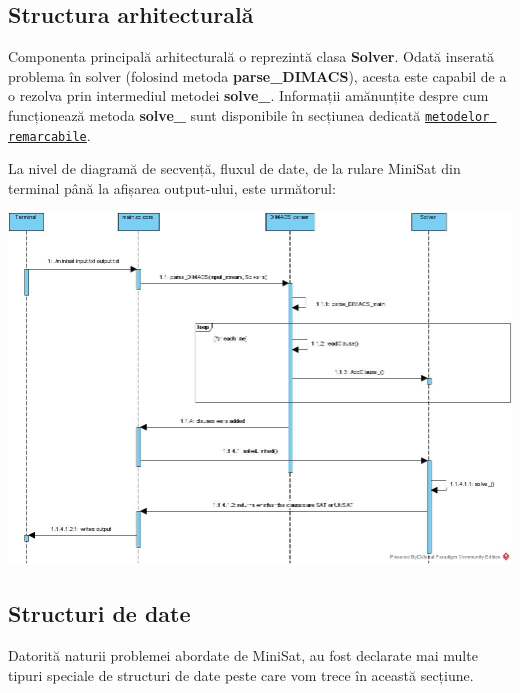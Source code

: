 \documentclass{llncs}
\begin{document}
\subsection{Structura arhitecturală}
Componenta principală arhitecturală o reprezintă clasa \textbf{Solver}. Odată inserată problema în solver (folosind metoda \textbf{parse\_DIMACS}), acesta este capabil de a o rezolva prin intermediul metodei \textbf{solve\_}. Informații amănunțite despre cum funcționează metoda \textbf{solve\_} sunt disponibile în secțiunea dedicată \hyperref[sec:metode_remarcabile]{\texttt{metodelor remarcabile}}.

La nivel de diagramă de secvență, fluxul de date, de la rulare MiniSat din terminal până la afișarea output-ului, este următorul:

\includegraphics[width=1\textwidth]{resources/Minisat_main_sequence_diagram.jpg}

\subsection{Structuri de date}
\label{sec:data_structures}
Datorită naturii problemei abordate de MiniSat, au fost declarate mai multe tipuri speciale de structuri de date peste care vom trece în această secțiune.
\end{document}
